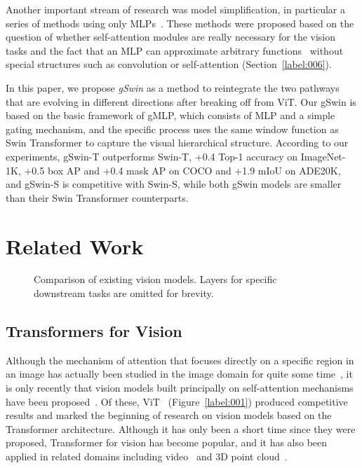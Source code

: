 \documentclass{article}
\begin{document}
Another important stream of research was model simplification, in particular a series of methods using only MLPs~\citep{tolstikhin2021mlp,touvron2021resmlp,liu2021pay}. These methods were proposed based on the question of whether self-attention modules are really necessary for the vision tasks and the fact that an MLP can approximate arbitrary functions~\citep{hornik1989multilayer} without special structures such as convolution or self-attention (Section~\ref{label:006}).

In this paper, we propose \textit{gSwin} as a method to reintegrate the two pathways that are evolving in different directions after breaking off from ViT. Our gSwin is based on the basic framework of gMLP, which consists of MLP and a simple gating mechanism, and the specific process uses the same window function as Swin Transformer to capture the visual hierarchical structure.
According to our experiments, gSwin-T outperforms Swin-T, +0.4 Top-1 accuracy on ImageNet-1K, +0.5 box AP and +0.4 mask AP on COCO and +1.9 mIoU on ADE20K, and gSwin-S is competitive with Swin-S, while both gSwin models are smaller than their Swin Transformer counterparts.

\section{Related Work}\label{label:000}
\begin{figure*}[t]
    \centering
    \centering
    \qquad
    \centering
    \qquad
    \caption{
        Comparison of existing vision models.
        Layers for specific downstream tasks are omitted for brevity.
    }
    \label{label:004}
\end{figure*}

\subsection{Transformers for Vision}\label{label:005}

Although the mechanism of attention that focuses directly on a specific region in an image has actually been studied in the image domain for quite some time~\citep{mnih2014recurrent,xu2015show,parmar2018image,woo2018cbam,cordonnier2019relationship,hu2018squeeze,zhang2020resnest}, it is only recently that vision models built principally on self-attention mechanisms have been proposed~\citep{carion2020end,wu2020visual,dosovitskiy2020image}. Of these, ViT~\citep{dosovitskiy2020image} (Figure~\ref{label:001}) produced competitive results and marked the beginning of research on vision models based on the Transformer architecture.
Although it has only been a short time since they were proposed, Transformer for vision has become popular, 
and it has also been applied in related domains including video~\citep{liu2021video,arnab2021vivit} and 3D point cloud~\citep{guo2021pct}.
\end{document}
